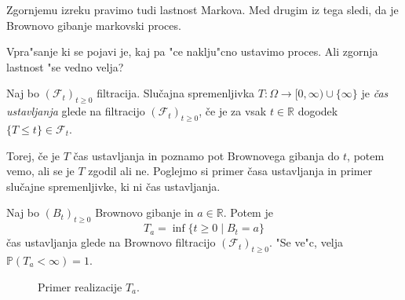 \documentclass[twoside,11pt]{article}
\begin{document}
\begin{opomba}
    Zgornjemu izreku pravimo tudi lastnost Markova. Med drugim iz tega sledi, da je Brownovo gibanje markovski proces.
\end{opomba}

Vpra"sanje ki se pojavi je, kaj pa "ce naklju"cno ustavimo proces. Ali zgornja lastnost "se vedno velja?

%

\begin{definicija}
    Naj bo $(\mathcal{F}_t)_{t\geq0}$ filtracija. Slučajna spremenljivka $T: \Omega \rightarrow [0, \infty)\cup \{\infty\}$ 
    je \textit{čas ustavljanja} glede na filtracijo $(\mathcal{F}_t)_{t\geq0}$, če je za vsak $t \in \mathbb{R}$ dogodek $\{T \leq t\} \in \mathcal{F}_t$.
\end{definicija}

Torej, če je $T$ čas ustavljanja in poznamo pot Brownovega gibanja do $t$, potem vemo, 
ali se je $T$  zgodil ali ne. Poglejmo si primer časa ustavljanja in primer slučajne spremenljivke, 
ki ni čas ustavljanja.

\pagebreak
\begin{primer}
    Naj bo $(B_t)_{t\geq0}$ Brownovo gibanje in $a \in \mathbb{R}$. Potem je
    $$
        T_a = \inf\{t \geq 0 \mid B_t = a\}
    $$
    čas ustavljanja glede na Brownovo filtracijo $(\mathcal{F}_t)_{t\geq0}$. "Se ve"c, velja $\mathbb{P}(T_a < \infty) = 1$.
\end{primer}

\begin{figure}[h]
    \centering
    \caption{Primer realizacije $T_a$.}
    \label{fig:slika3}
\end{figure}
\end{document}
